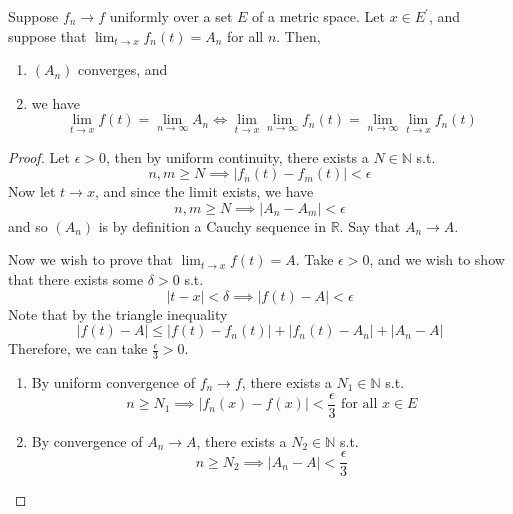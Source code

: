   \begin{theorem}
    Suppose $f_n \to f$ uniformly over a set $E$ of a metric space. Let $x \in E^\prime$, and suppose that $\lim_{t \to x} f_n (t) = A_n$ for all $n$. Then, 
    \begin{enumerate}
      \item $(A_n)$ converges, and 
      \item we have 
        \begin{equation}
          \lim_{t \to x} f(t) = \lim_{n \to \infty} A_n \iff \lim_{t \to x} \lim_{n \to \infty} f_n (t) = \lim_{n \to \infty} \lim_{t \to x} f_n (t)
        \end{equation}
    \end{enumerate}
  \end{theorem}
  \begin{proof}
    Let $\epsilon > 0$, then by uniform continuity, there exists a $N \in \mathbb{N}$ s.t. 
    \begin{equation}
      n, m \geq N \implies |f_n (t) - f_m (t)| < \epsilon
    \end{equation}
    Now let $t \to x$, and since the limit exists, we have 
    \begin{equation}
      n, m \geq N \implies |A_n - A_m| < \epsilon
    \end{equation} 
    and so $(A_n)$ is by definition a Cauchy sequence in $\mathbb{R}$. Say that $A_n \to A$. 

    Now we wish to prove that $\lim_{t \to x} f(t) = A$. Take $\epsilon > 0$, and we wish to show that there exists some $\delta > 0$ s.t. 
    \begin{equation}
      |t - x| < \delta \implies |f(t) - A| < \epsilon
    \end{equation}
    Note that by the triangle inequality
    \begin{equation}
      |f(t) - A| \leq |f(t) - f_n (t)| + |f_n (t) - A_n| + |A_n - A|
    \end{equation}
    Therefore, we can take $\frac{\epsilon}{3} > 0$. 
    \begin{enumerate}
      \item By uniform convergence of $f_n \to f$, there exists a $N_1 \in \mathbb{N}$ s.t. 
      \begin{equation}
        n \geq N_1 \implies |f_n (x) - f(x)| < \frac{\epsilon}{3} \text{ for all } x \in E
      \end{equation}

      \item By convergence of $A_n \to A$, there exists a $N_2 \in \mathbb{N}$ s.t. 
      \begin{equation}
        n \geq N_2 \implies |A_n - A| < \frac{\epsilon}{3} 
      \end{equation}


\end{enumerate}
\end{proof}
